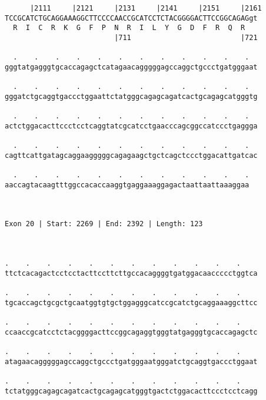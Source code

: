 \documentclass{article}
\begin{document}
\begin{Verbatim}
      |2111     |2121     |2131     |2141     |2151     |2161
TCCGCATCTGCAGGAAAGGCTTCCCCAACCGCATCCTCTACGGGGACTTCCGGCAGAGgt
  R  I  C  R  K  G  F  P  N  R  I  L  Y  G  D  F  R  Q  R   
                          |711                          |721
  
  .    .    .    .    .    .    .    .    .    .    .    .  
gggtatgagggtgcaccagagctcatagaacagggggagccaggctgccctgatgggaat
                                                            
  .    .    .    .    .    .    .    .    .    .    .    .  
gggatctgcaggtgaccctggaattctatgggcagagcagatcactgcagagcatgggtg
                                                            
  .    .    .    .    .    .    .    .    .    .    .    .  
actctggacacttccctcctcaggtatcgcatcctgaacccagcggccatccctgaggga
                                                            
  .    .    .    .    .    .    .    .    .    .    .    .  
cagttcattgatagcaggaagggggcagagaagctgctcagctccctggacattgatcac
                                                            
  .    .    .    .    .    .    .    .    .    .    .    .
aaccagtacaagtttggccacaccaaggtgaggaaaggagactaattaattaaaggaa
                                                          
                                                          
 
Exon 20 | Start: 2269 | End: 2392 | Length: 123



.    .    .    .    .    .    .    .    .    .    .    .    
ttctcacagactcctcctacttccttcttgccacaggggtgatggacaaccccctggtca
                                                            
.    .    .    .    .    .    .    .    .    .    .    .    
tgcaccagctgcgctgcaatggtgtgctggagggcatccgcatctgcaggaaaggcttcc
                                                            
.    .    .    .    .    .    .    .    .    .    .    .    
ccaaccgcatcctctacggggacttccggcagaggtgggtatgagggtgcaccagagctc
                                                            
.    .    .    .    .    .    .    .    .    .    .    .    
atagaacagggggagccaggctgccctgatgggaatgggatctgcaggtgaccctggaat
                                                            
.    .    .    .    .    .    .    .    .    .    .    .    
tctatgggcagagcagatcactgcagagcatgggtgactctggacacttccctcctcagg
                                                            

\end{Verbatim}
\end{document}
